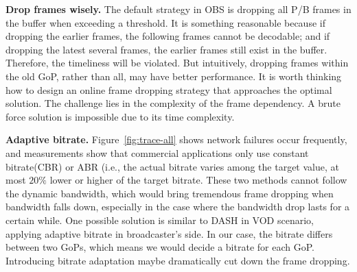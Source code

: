 
\textbf{Drop frames wisely.} The default strategy in OBS is dropping all P/B frames in the buffer when exceeding a threshold. It is something reasonable because if dropping the earlier frames, the following frames cannot be decodable; and if dropping the latest several frames, the earlier frames still exist in the buffer. Therefore, the timeliness will be violated. But intuitively, dropping frames within the old GoP, rather than all, may have better performance. It is worth thinking how to design an online frame dropping strategy that approaches the optimal solution. The challenge lies in the complexity of the frame dependency. A brute force solution is impossible due to its time complexity.

\textbf{Adaptive bitrate.} Figure~\ref{fig:trace-all} shows network failures occur frequently, and measurements show that commercial applications only use constant bitrate(CBR) or ABR (i.e., the actual bitrate varies among the target value, at most $20\%$ lower or higher of the target bitrate. These two methods cannot follow the dynamic bandwidth, which would bring tremendous frame dropping when bandwidth falls down, especially in the case where the bandwidth drop lasts for a certain while. One possible solution is similar to DASH in VOD scenario, applying adaptive bitrate in broadcaster's side. In our case, the bitrate differs between two GoPs, which means we would decide a bitrate for each GoP. Introducing bitrate adaptation maybe dramatically cut down the frame dropping.

\iffalse
\begin{itemize}
\item If we can relax the dependency between frames, the solution space would be larger and more optimal solutions are expected to be found. That is, we can relax the decodability constraints to be $d_i = 1, \forall i$.

\item We can relax queue length constraint, i.e., making $T_1$ larger. This change similarly increases the space of possible solutions.

\item The frame drop strategy can be improved. That is, compared with the naive strategy in OBS (dropping all P/B when exceeding a threshold), selectively choosing frames to drop in IP would give a more optimal solution.
\end{itemize}
\fi

